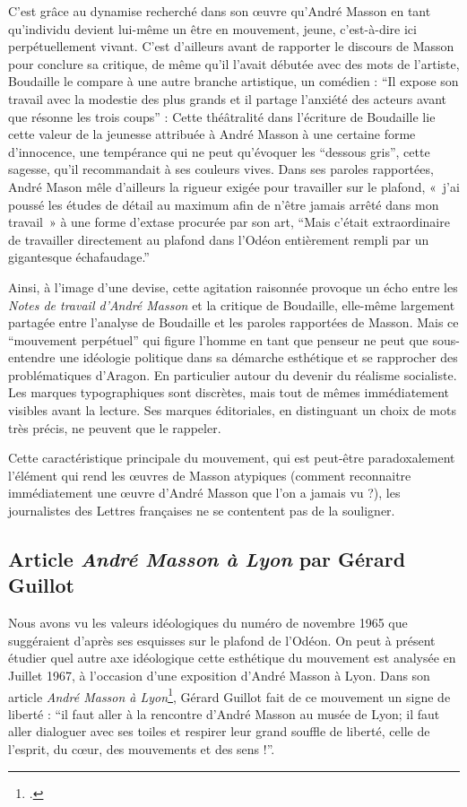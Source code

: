 	C’est grâce au dynamise recherché dans son \oe{}uvre qu’André Masson en tant qu’individu devient lui-même un être en mouvement, jeune, c’est-à-dire ici perpétuellement vivant. C’est d’ailleurs avant de rapporter le discours de Masson pour conclure sa critique, de même qu’il l’avait débutée avec des mots de l’artiste, Boudaille le compare à une autre branche artistique, un comédien : \enquote{Il expose son travail avec la modestie des plus grands et il partage l’anxiété des acteurs avant que résonne les trois coups} : Cette théâtralité dans l’écriture de Boudaille lie cette valeur de la jeunesse attribuée à André Masson à une certaine forme d’innocence, une tempérance qui ne peut qu’évoquer les \enquote{dessous gris}, cette sagesse, qu’il recommandait à ses couleurs vives. Dans ses paroles rapportées, André Mason mêle d’ailleurs la rigueur exigée pour travailler sur le plafond, « j’ai poussé les études de détail au maximum afin de n’être jamais arrêté dans mon travail » à une forme d’extase procurée par son art, \enquote{Mais c’était extraordinaire de travailler directement au plafond dans l’Odéon entièrement rempli par un gigantesque échafaudage.}

	Ainsi, à l’image d’une devise, cette agitation raisonnée provoque un écho entre les \emph{Notes de travail d’André Masson} et la critique de Boudaille, elle-même largement partagée entre l’analyse de Boudaille et les paroles rapportées de Masson. Mais ce \enquote{mouvement perpétuel} qui figure l’homme en tant que penseur ne peut que sous-entendre une idéologie politique dans sa démarche esthétique et se rapprocher des problématiques d’Aragon. En particulier autour du devenir du réalisme socialiste. Les marques typographiques sont discrètes, mais tout de mêmes immédiatement visibles avant la lecture. Ses marques éditoriales, en distinguant un choix de mots très précis, ne peuvent que le rappeler. 

	Cette caractéristique principale du mouvement, qui est peut-être paradoxalement l’élément qui rend les \oe{}uvres de Masson atypiques  (comment reconnaitre immédiatement une \oe{}uvre d’André Masson que l’on a jamais vu ?), les journalistes des Lettres françaises ne se contentent pas de la souligner. 

	\subsection{Article \emph{André Masson à Lyon} par Gérard Guillot }

 Nous avons vu les valeurs idéologiques du numéro de novembre 1965 que suggéraient d’après ses esquisses sur le plafond de l’Odéon. On peut à présent étudier quel autre axe idéologique cette esthétique du mouvement est analysée en Juillet 1967, à l’occasion d’une exposition d’André Masson à Lyon. Dans son article \emph{André Masson à Lyon}\footcite{massonlyon}, Gérard Guillot fait de ce mouvement un signe de liberté : \enquote{il faut aller à la rencontre d’André Masson au musée de Lyon; il faut aller dialoguer avec ses toiles et respirer leur grand souffle de liberté, celle de l’esprit, du c\oe{}ur, des mouvements et des sens !}. 

